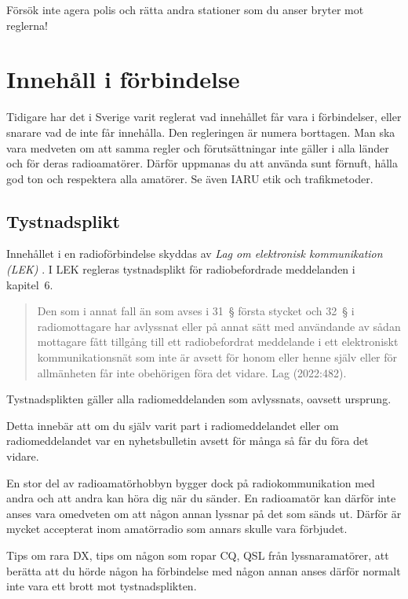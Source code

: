 Försök inte agera polis och rätta andra stationer som du anser bryter mot reglerna!

\section{Innehåll i förbindelse}
\label{innehåll i förbindelse}

Tidigare har det i Sverige varit reglerat vad innehållet får vara i
förbindelser, eller snarare vad de inte får innehålla.
Den regleringen är numera borttagen.
Man ska vara medveten om att samma regler och förutsättningar inte gäller i
alla länder och för deras radioamatörer.
Därför uppmanas du att använda sunt förnuft, hålla god ton och respektera alla
amatörer.
Se även IARU etik och trafikmetoder.

\subsection{Tystnadsplikt}

Innehållet i en radioförbindelse skyddas av
\emph{Lag om elektronisk kommunikation (LEK)} \cite{SFS2022:482}.
I LEK regleras tystnadsplikt för radiobefordrade meddelanden i kapitel~6.

\begin{quote}
	Den som i annat fall än som avses i 31~\S{} första stycket och 32~\S{} i
	radiomottagare har avlyssnat eller på annat sätt med användande av sådan
	mottagare fått tillgång till ett radiobefordrat meddelande i ett
	elektroniskt kommunikationsnät som inte är avsett för honom eller henne
	själv eller för allmänheten får inte obehörigen föra det vidare.
	Lag (2022:482).\cite[kap 9, \S33]{SFS2022:482}
\end{quote}

Tystnadsplikten gäller alla radiomeddelanden som avlyssnats, oavsett ursprung.

Detta innebär att om du själv varit part i radiomeddelandet eller om
radiomeddelandet var en nyhetsbulletin avsett för många så får du föra det vidare.

En stor del av radioamatörhobbyn bygger dock på radiokommunikation med andra och
att andra kan höra dig när du sänder.
En radioamatör kan därför inte anses vara omedveten om att någon annan lyssnar
på det som sänds ut.
Därför är mycket accepterat inom amatörradio som annars skulle vara förbjudet.

Tips om rara DX, tips om någon som ropar CQ, QSL från lyssnaramatörer, att
berätta att du hörde någon ha förbindelse med någon annan anses därför normalt
inte vara ett brott mot tystnadsplikten.

